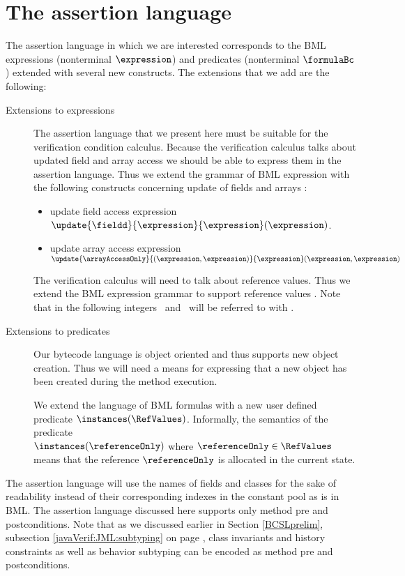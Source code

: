 \section{The assertion language} \label{assertLang:lang}
The assertion language in which we are interested corresponds to the
BML  expressions (nonterminal $\expression$) and predicates 
(nonterminal $\formulaBc$) extended with several new constructs.
 The extensions that we add are the following:
\begin{description}
    \item [Extensions to expressions] 
         The assertion language that we present here must be suitable for the verification condition calculus.
	 Because the verification calculus talks about updated field and array access
	 we should be able  to express  them in the assertion language. Thus we extend the grammar of BML expression
	 with the following constructs concerning update of fields and arrays :

        \begin{itemize}
	       \item update field access expression 
		  $\update{\fieldd}{ \expression}{\expression}(\expression)$.

	       \item update array access expression \\
                   $ \update{ \arrayAccessOnly}{ (\expression , \expression)}{ \expression} (\expression,\expression)$
	\end{itemize}

	The verification calculus will need to talk about reference values. Thus we extend the BML expression grammar to  support
	reference values \RefValues. Note that in the following integers \Myint\  and \RefValues \ will be referred to with \Values.
    \item [Extensions to predicates] Our bytecode language is object oriented and thus supports new object creation. Thus we
          will need a means for expressing that a new object has been created during the method execution. 

	  We extend the language of BML  formulas
	  with a new user defined predicate $ \instances(\RefValues)$. Informally, the semantics of the predicate \\
	  $\instances(\referenceOnly)$ where $\referenceOnly \in \RefValues$
	  means that the reference $\referenceOnly  $  is allocated in the current state.
        
\end{description}

The assertion language will use the names of fields and classes for the sake of readability instead of their corresponding indexes
in the constant pool as is in BML. 
The assertion language discussed here supports only method pre and postconditions. Note that as we discussed earlier in 
Section \ref{BCSLprelim}, subsection \ref{javaVerif:JML:subtyping} on page \pageref{javaVerif:JML:subtyping}, class invariants and 
history constraints as well as behavior subtyping can be encoded as method pre and postconditions. 
